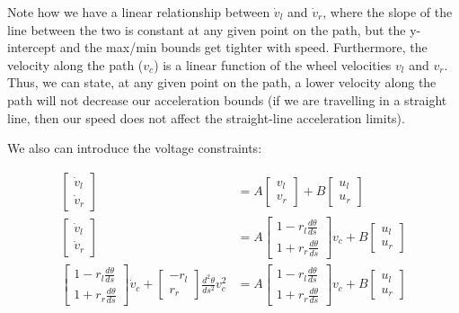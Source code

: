 \documentclass{article}
\begin{document}
Note how we have a linear relationship between $\dot{v}_l$ and $\dot{v}_r$,
where the slope of the line between the two is constant at any given point on
the path, but the y-intercept and the max/min bounds get tighter with speed.
Furthermore, the velocity along the path ($v_c$) is a linear function of the
wheel velocities $v_l$ and $v_r$. Thus, we can state, at any given point on the
path, a lower velocity along the path will not decrease our acceleration
bounds (if we are travelling in a straight line, then our speed does not affect
the straight-line acceleration limits).

We also can introduce the voltage constraints:

\begin{align}
\begin{bmatrix} \dot{v}_l \\ \dot{v}_r \end{bmatrix} &=
   A \begin{bmatrix} v_l \\ v_r \end{bmatrix} + B \begin{bmatrix} u_l \\ u_r
   \end{bmatrix} \\
\begin{bmatrix} \dot{v}_l \\ \dot{v}_r \end{bmatrix} &=
   A \begin{bmatrix} 1 - r_l \frac{d\theta}{ds} \\ 1 + r_r \frac{d\theta}{ds}
     \end{bmatrix} v_c + B \begin{bmatrix} u_l \\ u_r \end{bmatrix} \\
\begin{bmatrix} 1 - r_l \frac{d\theta}{ds} \\ 1 + r_r \frac{d\theta}{ds}
  \end{bmatrix} \dot{v}_c +   \begin{bmatrix} -r_l \\ r_r \end{bmatrix} \frac{d^2\theta}{ds^2} v_c^2
  &= A \begin{bmatrix} 1 - r_l \frac{d\theta}{ds} \\ 1 + r_r \frac{d\theta}{ds}
     \end{bmatrix} v_c + B \begin{bmatrix} u_l \\ u_r \end{bmatrix} \\
\end{align}
\end{document}

